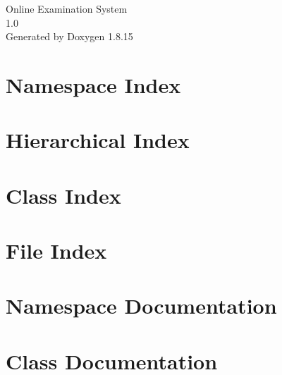 \let\mypdfximage\pdfximage\def\pdfximage{\immediate\mypdfximage}\documentclass[twoside]{book}
\newcommand{\+}{\discretionary{\mbox{\scriptsize$\hookleftarrow$}}{}{}}
\newcommand{\clearemptydoublepage}{%
  \newpage{\pagestyle{empty}\cleardoublepage}%
}
\begin{document}
\hypersetup{pageanchor=false,
             bookmarksnumbered=true,
             pdfencoding=unicode
            }
\begin{titlepage}
\vspace*{7cm}
\begin{center}%
{\Large Online Examination System \\[1ex]\large 1.\+0 }\\
\vspace*{1cm}
{\large Generated by Doxygen 1.8.15}\\
\end{center}
\end{titlepage}
\clearemptydoublepage
{}
\tableofcontents
\clearemptydoublepage
{}
\hypersetup{pageanchor=true}

\chapter{Namespace Index}

\chapter{Hierarchical Index}

\chapter{Class Index}

\chapter{File Index}

\chapter{Namespace Documentation}


\chapter{Class Documentation}
































\end{document}
